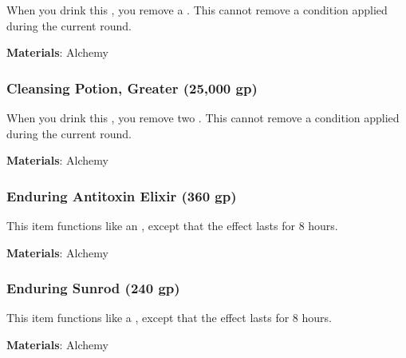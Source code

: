 When you drink this , you remove a .
This cannot remove a condition applied during the current round.



\vspace{0.25em}
\textbf{Materials}: Alchemy


\lowercase{\hypertarget{item:Cleansing Potion, Greater}{}}\label{item:Cleansing Potion, Greater}
\hypertarget{item:Cleansing Potion, Greater}{\subsubsection{Cleansing Potion, Greater\hfill{} (25,000 gp)}}

When you drink this , you remove two .
This cannot remove a condition applied during the current round.



\vspace{0.25em}
\textbf{Materials}: Alchemy


\lowercase{\hypertarget{item:Enduring Antitoxin Elixir}{}}\label{item:Enduring Antitoxin Elixir}
\hypertarget{item:Enduring Antitoxin Elixir}{\subsubsection{Enduring Antitoxin Elixir\hfill{} (360 gp)}}

This item functions like an , except that the effect lasts for 8 hours.



\vspace{0.25em}
\textbf{Materials}: Alchemy


\lowercase{\hypertarget{item:Enduring Sunrod}{}}\label{item:Enduring Sunrod}
\hypertarget{item:Enduring Sunrod}{\subsubsection{Enduring Sunrod\hfill{} (240 gp)}}

This item functions like a , except that the effect lasts for 8 hours.



\vspace{0.25em}
\textbf{Materials}: Alchemy


